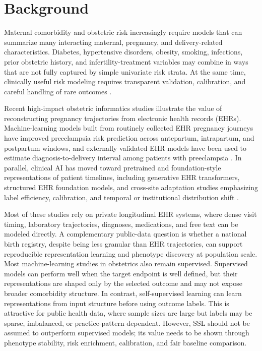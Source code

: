 \documentclass[pdflatex,sn-vancouver-num]{sn-jnl}
\begin{document}
\maketitle

\section{Background}\label{sec:background}

Maternal comorbidity and obstetric risk increasingly require models that can summarize many interacting maternal, pregnancy, and delivery-related characteristics. Diabetes, hypertensive disorders, obesity, smoking, infections, prior obstetric history, and infertility-treatment variables may combine in ways that are not fully captured by simple univariate risk strata. At the same time, clinically useful risk modeling requires transparent validation, calibration, and careful handling of rare outcomes \cite{vancalster2019calibration,saito2015precision,guo2017calibration}.

Recent high-impact obstetric informatics studies illustrate the value of reconstructing pregnancy trajectories from electronic health records (EHRs). Machine-learning models built from routinely collected EHR pregnancy journeys have improved preeclampsia risk prediction across antepartum, intrapartum, and postpartum windows, and externally validated EHR models have been used to estimate diagnosis-to-delivery interval among patients with preeclampsia \cite{li2022preeclampsia_emr,yang2025preeclampsia_delivery}. In parallel, clinical AI has moved toward pretrained and foundation-style representations of patient timelines, including generative EHR transformers, structured EHR foundation models, and cross-site adaptation studies emphasizing label efficiency, calibration, and temporal or institutional distribution shift \cite{kraljevic2024foresight,yang2023transformehr,guo2024shared_ehr_foundation}.

Most of these studies rely on private longitudinal EHR systems, where dense visit timing, laboratory trajectories, diagnoses, medications, and free text can be modeled directly. A complementary public-data question is whether a national birth registry, despite being less granular than EHR trajectories, can support reproducible representation learning and phenotype discovery at population scale. Most machine-learning studies in obstetrics also remain supervised. Supervised models can perform well when the target endpoint is well defined, but their representations are shaped only by the selected outcome and may not expose broader comorbidity structure. In contrast, self-supervised learning can learn representations from input structure before using outcome labels. This is attractive for public health data, where sample sizes are large but labels may be sparse, imbalanced, or practice-pattern dependent. However, SSL should not be assumed to outperform supervised models; its value needs to be shown through phenotype stability, risk enrichment, calibration, and fair baseline comparison.
\end{document}
